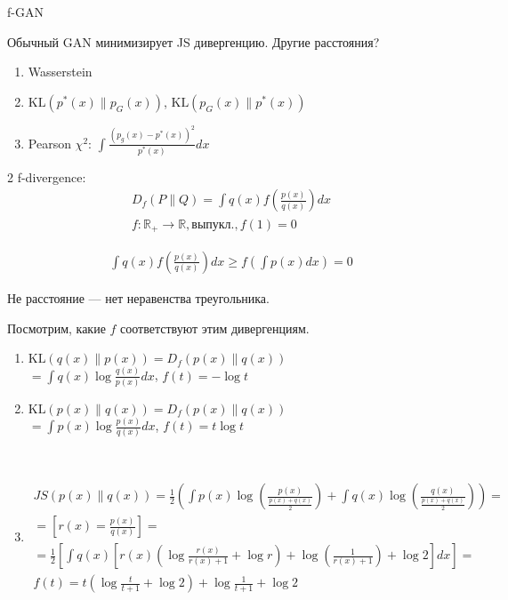 \documentclass{book}
\begin{document}
f-GAN

Обычный GAN минимизирует JS дивергенцию. Другие расстояния?
\begin{enumerate}
    \item Wasserstein\\
    \item $\mathrm{KL}(p^*(x)\|p_G(x))$, $\mathrm{KL}(p_G(x)\|p^*(x))$\\
    \item Pearson $\chi^2$: $\int {\frac{(p_g(x)-p^*(x))^2}{p^*(x)}dx}$
\end{enumerate}
2
f-divergence:
\begin{gather*}
    D_f(P\|Q)=\int {q(x)f\left(\frac{p(x)}{q(x)}\right)dx}\\
    f: \mathbb{R}_+ \rightarrow \mathbb{R}, \textrm{выпукл.}, f(1)=0
\end{gather*}

\begin{gather*}
    \int {q(x)f\left(\frac{p(x)}{q(x)}\right)dx}\geq f\left(\int {p(x)dx}\right)=0
\end{gather*}

Не расстояние --- нет неравенства треугольника.

Посмотрим, какие $f$ соответствуют этим дивергенциям.
\begin{enumerate}
    \item $\mathrm{KL}(q(x)\|p(x))=D_f(p(x)\|q(x))$ \\
        $=\int {q(x)\log \frac{q(x)}{p(x)}dx}$, $f(t)=-\log t$\\
    \item $\mathrm{KL}(p(x)\|q(x))=D_f(p(x)\|q(x))$ \\
        $=\int {p(x)\log \frac{p(x)}{q(x)}dx}$, $f(t)=t\log t$

    \\
\item \begin{gather*}
    JS(p(x)\|q(x))=\frac{1}{2}\left(\int {p(x)\log \left(\frac{p(x)}{\frac{p(x)+q(x)}{2}}\right)}+\int {q(x)\log \left(\frac{q(x)}{\frac{p(x)+q(x)}{2}}\right)}\right)=\\
    =\left[r(x)=\frac{p(x)}{q(x)}\right]=\\
    =\frac{1}{2}\left[\int {q(x)\left[r(x)\left(\log \frac{r(x)}{r(x)+1}+\log r\right)+\log \left(\frac{1}{r(x)+1}\right)+\log 2\right]}dx\right]=\\
    f(t)=t\left(\log \frac{t}{t+1} + \log 2\right)+\log\frac{1}{t+1}+\log 2
\end{gather*}
\end{enumerate}
\end{document}

